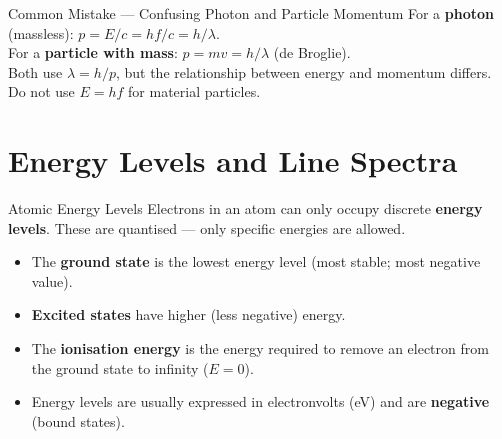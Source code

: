 \begin{warningbox}{Common Mistake — Confusing Photon and Particle Momentum}
For a \textbf{photon} (massless): $p = E/c = hf/c = h/\lambda$.\\
For a \textbf{particle with mass}: $p = mv = h/\lambda$ (de Broglie).\\
Both use $\lambda = h/p$, but the relationship between energy and momentum differs. Do not use $E = hf$ for material particles.
\end{warningbox}

\section{Energy Levels and Line Spectra}

\begin{definitionbox}{Atomic Energy Levels}
Electrons in an atom can only occupy discrete \textbf{energy levels}. These are quantised — only specific energies are allowed.
\begin{itemize}[itemsep=2pt]
  \item The \textbf{ground state} is the lowest energy level (most stable; most negative value).
  \item \textbf{Excited states} have higher (less negative) energy.
  \item The \textbf{ionisation energy} is the energy required to remove an electron from the ground state to infinity ($E = 0$).
  \item Energy levels are usually expressed in electronvolts (eV) and are \textbf{negative} (bound states).
\end{itemize}
\end{definitionbox}

